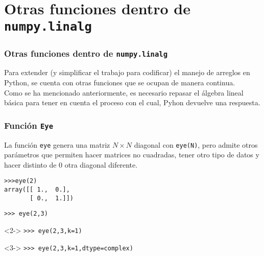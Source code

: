\section{Otras funciones dentro de \texttt{numpy.linalg}}
\begin{frame}
\frametitle{Otras funciones dentro de \texttt{numpy.linalg}}
Para extender (y simplificar el trabajo para codificar) el manejo de arreglos en Python, se cuenta con otras funciones que se ocupan de manera continua.
\\
\bigskip
Como se ha mencionado anteriormente, es necesario repasar el álgebra lineal básica para tener en cuenta el proceso con el cual, Pyhon devuelve una respuesta.
\end{frame}
\begin{frame}[fragile]
\frametitle{Función \texttt{Eye}}
La función \texttt{eye} genera una matriz $N \times	N$ diagonal con \verb|eye(N)|, pero admite otros parámetros que permiten hacer matrices no cuadradas, tener otro tipo de datos y hacer distinto de $0$ otra diagonal diferente.
\begin{exampleblock}{}
\verb|>>>eye(2)| \\
\pause
\verb|array([[ 1.,  0.],| \\
\verb|       [ 0.,  1.]])|
\end{exampleblock}
\end{frame}
\begin{frame}[fragile]
\begin{exampleblock}{}
\verb|>>> eye(2,3)| \\
\pause
{}
\end{exampleblock}
\begin{exampleblock}{}<2->
\verb|>>> eye(2,3,k=1)| \\
\end{exampleblock}
\begin{exampleblock}{}<3->
\verb|>>> eye(2,3,k=1,dtype=complex)| \\
\end{exampleblock}
\end{frame}
